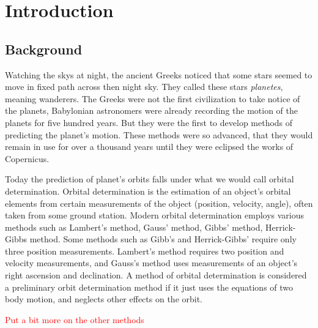 \documentclass[12pt]{article}
\begin{document}
	\newpage

	\section{Introduction}
	\subsection{Background}
	Watching the skys at night, the ancient Greeks noticed that some stars seemed to move in fixed path across then night sky. They called these stars \textit{planetes}, meaning wanderers. The Greeks were not the first civilization to take notice of the planets, Babylonian astronomers were already recording the motion of the planets for five hundred years. But they were the first to develop methods of predicting the planet's motion. These methods were so advanced, that they would remain in use for over a thousand years until they were eclipsed the works of Copernicus\cite{lectureOnGreekAstro}. %
	
	Today the prediction of planet's orbits falls under what we would call orbital determination. Orbital determination is the estimation of an object's orbital elements from certain measurements of the object (position, velocity, angle), often taken from some ground station. Modern orbital determination employs various methods such as Lambert's method, Gauss' method, Gibbs' method, Herrick-Gibbs method. Some methods such as Gibb's and Herrick-Gibbs' require only three position measurements. Lambert's method requires two position and velocity measurements, and Gauss's method uses measurements of an object's right ascension and declination. A method of orbital determination is considered a preliminary orbit determination method if it just uses the equations of two body motion, and neglects other effects on the orbit.\par 
	
	
	
		\textcolor{red}{Put a bit more on the other methods}
\end{document}
